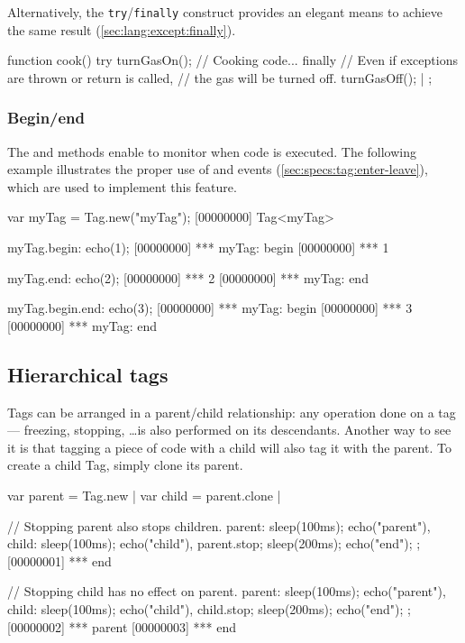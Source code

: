 Alternatively, the \lstinline|try|/\lstinline|finally| construct provides an
elegant means to achieve the same result (\autoref{sec:lang:except:finally}).

\begin{urbiscript}
{
  function cook()
  {
    try
    {
      turnGasOn();
      // Cooking code...
    }
    finally
    {
      // Even if exceptions are thrown or return is called,
      // the gas will be turned off.
      turnGasOff();
    }
  }|
};
\end{urbiscript}

\subsubsection{Begin/end}
\label{sec:specs:tag:begin-end}

The  and  methods enable to monitor when code is
executed.  The following example illustrates the proper use of
 and  events
(\autoref{sec:specs:tag:enter-leave}), which are used to implement this
feature.

\begin{urbiscript}
var myTag = Tag.new("myTag");
[00000000] Tag<myTag>

myTag.begin: echo(1);
[00000000] *** myTag: begin
[00000000] *** 1

myTag.end: echo(2);
[00000000] *** 2
[00000000] *** myTag: end

myTag.begin.end: echo(3);
[00000000] *** myTag: begin
[00000000] *** 3
[00000000] *** myTag: end
\end{urbiscript}

\subsection{Hierarchical tags}

Tags can be arranged in a parent/child relationship: any operation done on a
tag --- freezing, stopping, \ldots is also performed on its descendants.
Another way to see it is that tagging a piece of code with a child will also
tag it with the parent. To create a child Tag, simply clone its parent.

\begin{urbiscript}
var parent = Tag.new |
var child = parent.clone |

// Stopping parent also stops children.
{
  parent: {sleep(100ms); echo("parent")},
  child:  {sleep(100ms); echo("child")},
  parent.stop;
  sleep(200ms);
  echo("end");
};
[00000001] *** end

// Stopping child has no effect on parent.
{
  parent: {sleep(100ms); echo("parent")},
  child:  {sleep(100ms); echo("child")},
  child.stop;
  sleep(200ms);
  echo("end");
};
[00000002] *** parent
[00000003] *** end
\end{urbiscript}

